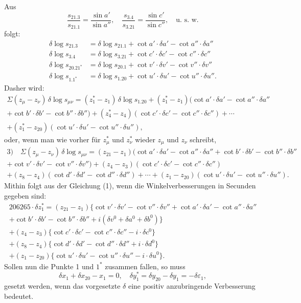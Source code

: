 \documentclass[12pt,a4paper]{article}
\theoremstyle{plain}
\theoremstyle{definition}
\theoremstyle{remark}
\begin{document}
Aus
\[\frac{s_{21.3}}{s_{21.1}} = \frac{\sin a'}{\sin a''}, \quad \frac{s_{3.4}}{s_{3.21}} = \frac{\sin c'}{\sin c''}, \quad \text{u.\ s.\ w.}\]
folgt:
\begin{align*}
\delta\log s_{21.3} &= \delta\log s_{21.1} + \cot a' \cdot \delta a' - \cot a'' \cdot \delta a''\\
\delta\log s_{3.4} &= \delta\log s_{3.21} + \cot c' \cdot \delta c' - \cot c'' \cdot \delta c''\\
\delta\log s_{20.21^*} &= \delta\log s_{20.1} + \cot v' \cdot \delta v' - \cot v'' \cdot \delta v''\\
\delta\log s_{1.1^*} &= \delta\log s_{1.20} + \cot u' \cdot \delta u' - \cot u'' \cdot \delta u''.
\end{align*}
Dasher wird:
\begin{multline*}
\Sigma(z_\mu - z_\nu)\,\delta\log s_{\mu\nu} = (z_1^* - z_1)\,\delta\log s_{1.20} + (z_1^* - z_1)(\cot a' \cdot \delta a' - \cot a'' \cdot \delta a''\\
+ \cot b' \cdot \delta b' - \cot b'' \cdot \delta b'') + (z_4^* - z_4)(\cot c' \cdot \delta c' - \cot c'' \cdot \delta c'') + \cdots\\
+ (z_1^* - z_{20})(\cot u' \cdot \delta u' - \cot u'' \cdot \delta u''),
\end{multline*}
oder, wenn man wie vorher f\"ur $z_\mu^*$ und $z_\nu^*$ wieder $z_\mu$ und $z_\nu$ schreibt,
\begin{multline*}
\text{3)}\quad \Sigma(z_\mu - z_\nu)\,\delta\log s_{\mu\nu} = (z_{21} - z_1)(\cot a' \cdot \delta a' - \cot a'' \cdot \delta a'' + \cot b' \cdot \delta b' - \cot b'' \cdot \delta b''\\
+ \cot v' \cdot \delta v' - \cot v'' \cdot \delta v'') + (z_4 - z_3)(\cot c' \cdot \delta c' - \cot c'' \cdot \delta c'')\\
+ (z_8 - z_4)(\cot d' \cdot \delta d' - \cot d'' \cdot \delta d'') + \cdots + (z_1 - z_{20})(\cot u' \cdot \delta u' - \cot u'' \cdot \delta u'').
\end{multline*}
Mithin folgt aus der Gleichung (1), wenn die Winkelverbesserungen in Secunden gegeben sind:
\begin{multline*}
206265 \cdot \delta z_1^* = (z_{21} - z_1)\{\cot v' \cdot \delta v' - \cot v'' \cdot \delta v'' + \cot a' \cdot \delta a' - \cot a'' \cdot \delta a''\\
+ \cot b' \cdot \delta b' - \cot b'' \cdot \delta b'' + i(\delta v^0 + \delta a^0 + \delta b^0)\}\\
+ (z_4 - z_3)\{\cot c' \cdot \delta c' - \cot c'' \cdot \delta c'' - i \cdot \delta c^0\}\\
+ (z_8 - z_4)\{\cot d' \cdot \delta d' - \cot d'' \cdot \delta d'' + i \cdot \delta d^0\}\\
+ (z_1 - z_{20})\{\cot u' \cdot \delta u' - \cot u'' \cdot \delta u'' - i \cdot \delta u^0\}.
\end{multline*}
Sollen nun die Punkte 1 und $1^*$ zusammen fallen, so muss
\[\delta x_1 + \delta x_{20} - x_1 = 0, \quad \delta y_1^* = \delta y_{20} - \delta y_1 = -\delta\varepsilon_1,\]
gesetzt werden, wenn das vorgesetzte $\delta$ eine positiv anzubringende Verbesserung bedeutet.
\end{document}
